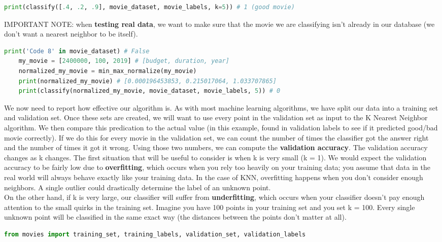 \documentclass[11pt, a4paper]{article}
\begin{document}
\begin{spacing}{1.1}
\begin{lstlisting}[language=Python]
	print(classify([.4, .2, .9], movie_dataset, movie_labels, k=5)) # 1 (good movie) \end{lstlisting}\vspace*{1mm}
	IMPORTANT NOTE: when \textbf{testing real data}, we want to make sure that the movie we are classifying isn't already in our database (we don't want a nearest neighbor to be itself). 
	\begin{lstlisting}[language=Python]
	print('Code 8' in movie_dataset) # False
	my_movie = [2400000, 100, 2019] # [budget, duration, year]
	normalized_my_movie = min_max_normalize(my_movie)
	print(normalized_my_movie) # [0.000196453853, 0.215017064, 1.033707865]
	print(classify(normalized_my_movie, movie_dataset, movie_labels, 5)) # 0 \end{lstlisting}\vspace*{1mm}
	We now need to report how effective our algorithm is. As with most machine learning algorithms, we have split our data into a training set and validation set. Once these sets are created, we will want to use every point in the validation set as input to the K Nearest Neighbor algorithm. We then compare this predication to the actual value (in this example, found in validation labels to see if it predicted good/bad movie correctly).  If we do this for every movie in the validation set, we can count the number of times the classifier got the answer right and the number of times it got it wrong. Using those two numbers, we can compute the \textbf{validation accuracy}. The validation accuracy changes as k changes. \newpage
	\noindent The first situation that will be useful to consider is when k is very small (k = 1). We would expect the validation accuracy to be fairly low due to \textbf{overfitting}, which occurs when you rely too heavily on your training data; you assume that data in the real world will always behave exactly like your training data. In the case of KNN, overfitting happens when you don’t consider enough neighbors. A single outlier could drastically determine the label of an unknown point. \vspace*{2mm} \\
	On the other hand, if k is very large, our classifier will suffer from \textbf{underfitting}, which occurs when your classifier doesn’t pay enough attention to the small quirks in the training set. Imagine you have 100 points in your training set and you set k = 100. Every single unknown point will be classified in the same exact way (the distances between the points don’t matter at all). 
	\begin{lstlisting}[language=Python]
	from movies import training_set, training_labels, validation_set, validation_labels
	

\end{lstlisting}
\end{spacing}
\end{document}
